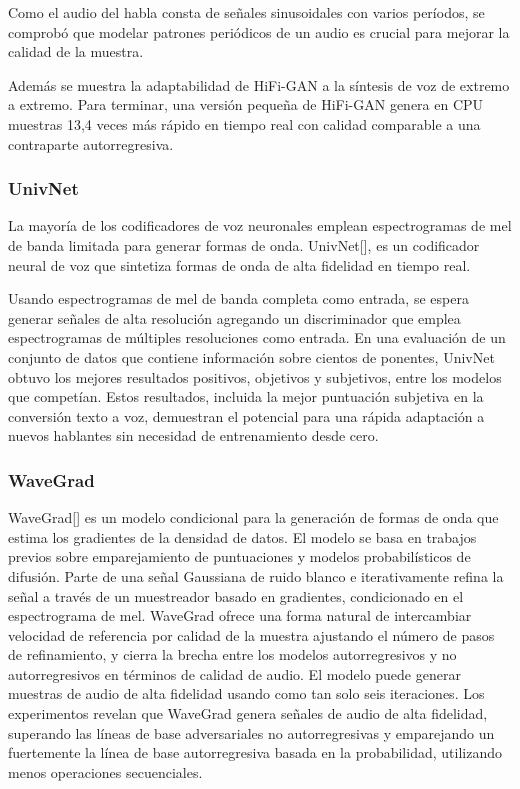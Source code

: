 Como el audio del habla consta de señales sinusoidales con varios períodos, se comprobó que modelar patrones periódicos de un audio es crucial para mejorar la calidad de la muestra.

Además se muestra la adaptabilidad de HiFi-GAN a la síntesis de voz de extremo a extremo. Para terminar, una versión pequeña de HiFi-GAN genera en CPU muestras 13,4 veces más rápido en tiempo real con calidad comparable a una contraparte autorregresiva.


\subsubsection{UnivNet}
La mayoría de los codificadores de voz neuronales emplean espectrogramas de mel de banda limitada para generar formas de onda. UnivNet[\cite{jang2021univnet}], es un codificador neural de voz que sintetiza formas de onda de alta fidelidad en tiempo real. 

Usando espectrogramas de mel de banda completa como entrada, se espera generar señales de alta resolución agregando un discriminador que emplea espectrogramas de múltiples resoluciones como entrada. En una evaluación de un conjunto de datos que contiene información sobre cientos de ponentes, UnivNet obtuvo los mejores resultados positivos, objetivos y subjetivos,  entre los modelos que competían. Estos resultados, incluida la mejor puntuación subjetiva en la conversión texto a voz, demuestran el potencial para una rápida adaptación a nuevos hablantes sin necesidad de entrenamiento desde cero.

\subsubsection{WaveGrad}

WaveGrad[\cite{chen2020wavegrad}] es un modelo condicional para la generación de formas de onda que estima los gradientes de la densidad de datos. El modelo se basa en trabajos previos sobre emparejamiento de puntuaciones y modelos probabilísticos de difusión. Parte de una señal Gaussiana de ruido blanco e iterativamente refina la señal a través de un muestreador basado en gradientes, condicionado en el espectrograma de mel. WaveGrad ofrece una forma natural de intercambiar velocidad de referencia por calidad de la muestra ajustando el número de pasos de refinamiento, y cierra la brecha entre los modelos autorregresivos y no autorregresivos en términos de calidad de audio. El modelo puede generar muestras de audio de alta fidelidad usando como tan solo seis iteraciones. Los experimentos revelan que WaveGrad genera señales de audio de alta fidelidad, superando las líneas de base adversariales no autorregresivas y emparejando un fuertemente la línea de base autorregresiva basada en la probabilidad, utilizando menos operaciones secuenciales.


